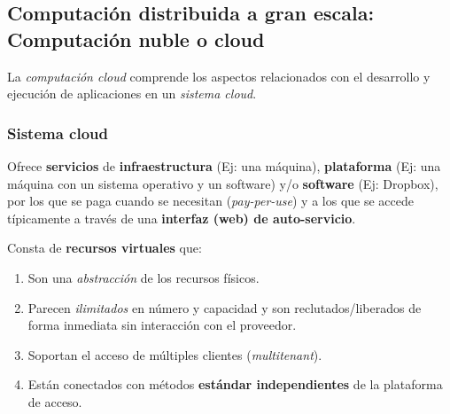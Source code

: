 \documentclass[10pt,a4paper,spanish]{report}
\begin{document}
\textcolor[rgb]{0.2,0.4,0.8}{\subsection{Computación distribuida a gran escala: Computación nuble o cloud}}
La \textit{\textcolor[rgb]{0.2,0.4,0.8}{computación cloud}} comprende los aspectos relacionados con el desarrollo y ejecución de aplicaciones en un \textit{\textcolor[rgb]{0.2,0.4,0.8}{sistema cloud}}.


\textcolor[rgb]{0.2,0.4,0.8}{\subsubsection{Sistema cloud}}
Ofrece \textbf{\textcolor[rgb]{0.2,0.4,0.8}{servicios}} de \textbf{\textcolor[rgb]{0.2,0.4,0.8}{infraestructura}} (Ej: una máquina), \textbf{\textcolor[rgb]{0.2,0.4,0.8}{plataforma}} (Ej: una máquina con un sistema operativo y un software) y/o \textbf{\textcolor[rgb]{0.2,0.4,0.8}{software}} (Ej: Dropbox), por los que se paga cuando se necesitan (\textit{\textcolor[rgb]{0.2,0.4,0.8}{pay-per-use}}) y a los que se accede típicamente a través de una \textbf{\textcolor[rgb]{0.2,0.4,0.8}{interfaz (web) de auto-servicio}}.

Consta de \textbf{\textcolor[rgb]{0.2,0.4,0.8}{recursos virtuales}} que:
\begin{enumerate}[\color{azul}{\bf $\heartsuit$}]
  \item Son una \textit{\textcolor[rgb]{0.2,0.4,0.8}{abstracción}} de los recursos físicos.
  \item Parecen \textit{\textcolor[rgb]{0.2,0.4,0.8}{ilimitados}} en número y capacidad y son reclutados/liberados de forma inmediata sin interacción con el proveedor.
  \item Soportan el acceso de múltiples clientes (\textit{\textcolor[rgb]{0.2,0.4,0.8}{multitenant}}).
  \item Están conectados con métodos \textbf{\textcolor[rgb]{0.2,0.4,0.8}{estándar independientes}} de la plataforma de acceso.
\end{enumerate}
\end{document}
